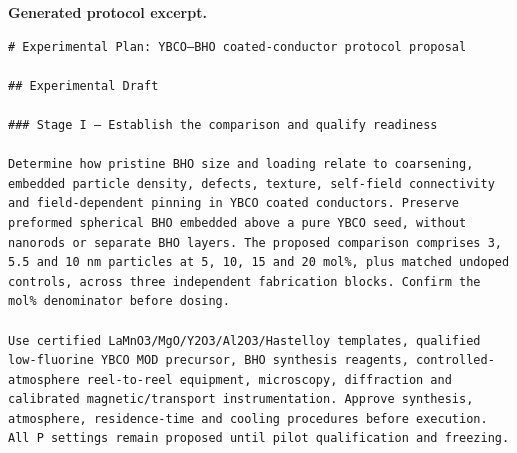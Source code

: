 \clearpage
\noindent\textbf{Generated protocol excerpt.}
\begin{lstlisting}[style=jsonstyle,basicstyle=\fontsize{8}{9.6}\selectfont\ttfamily,backgroundcolor=\color{white}]
# Experimental Plan: YBCO–BHO coated-conductor protocol proposal

## Experimental Draft

### Stage I — Establish the comparison and qualify readiness

Determine how pristine BHO size and loading relate to coarsening, embedded particle density, defects, texture, self-field connectivity and field-dependent pinning in YBCO coated conductors. Preserve preformed spherical BHO embedded above a pure YBCO seed, without nanorods or separate BHO layers. The proposed comparison comprises 3, 5.5 and 10 nm particles at 5, 10, 15 and 20 mol%, plus matched undoped controls, across three independent fabrication blocks. Confirm the mol% denominator before dosing.

Use certified LaMnO3/MgO/Y2O3/Al2O3/Hastelloy templates, qualified low-fluorine YBCO MOD precursor, BHO synthesis reagents, controlled-atmosphere reel-to-reel equipment, microscopy, diffraction and calibrated magnetic/transport instrumentation. Approve synthesis, atmosphere, residence-time and cooling procedures before execution. All P settings remain proposed until pilot qualification and freezing.
\end{lstlisting}

